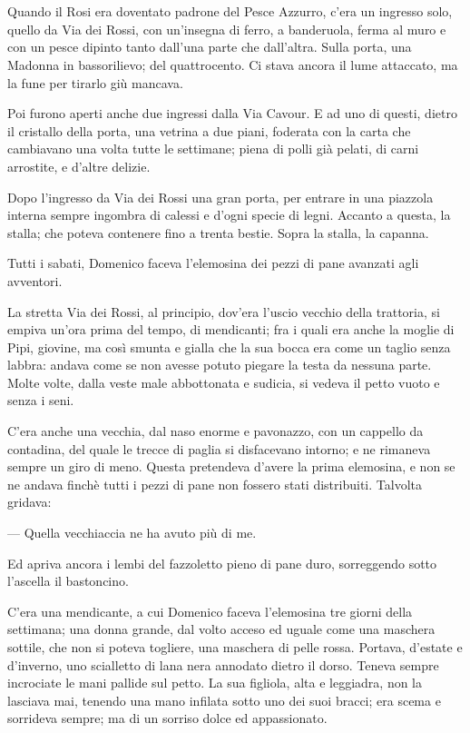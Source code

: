 \chapter{}

Quando il Rosi era doventato padrone del Pesce Azzurro, c’era un ingresso solo, quello da Via dei Rossi, con un’insegna di ferro, a banderuola, ferma al muro e con un pesce dipinto tanto dall’una parte che dall’altra. Sulla porta, una Madonna in bassorilievo; del quattrocento. Ci stava ancora il lume attaccato, ma la fune per tirarlo giù mancava.

Poi furono aperti anche due ingressi dalla Via Cavour. E ad uno di questi, dietro il cristallo della porta, una vetrina a due piani, foderata con la carta che cambiavano una volta tutte le settimane; piena di polli già pelati, di carni arrostite, e d’altre delizie.

Dopo l’ingresso da Via dei Rossi una gran porta, per entrare in una piazzola interna sempre ingombra di calessi e d’ogni specie di legni. Accanto a questa, la stalla; che poteva contenere fino a trenta bestie. Sopra la stalla, la capanna.

Tutti i sabati, Domenico faceva l’elemosina dei pezzi di pane avanzati agli avventori.

La stretta Via dei Rossi, al principio, dov’era l’uscio vecchio della trattoria, si empiva un’ora prima del tempo, di mendicanti; fra i quali era anche la moglie di Pipi, giovine, ma così smunta e gialla che la sua bocca era come un taglio senza labbra: andava come se non avesse potuto piegare la testa da nessuna parte. Molte volte, dalla veste male abbottonata e sudicia, si vedeva il petto vuoto e senza i seni.

C’era anche una vecchia, dal naso enorme e pavonazzo, con un cappello da contadina, del quale le trecce di paglia si disfacevano intorno; e ne rimaneva sempre un giro di meno. Questa pretendeva d’avere la prima elemosina, e non se ne andava finchè tutti i pezzi di pane non fossero stati distribuiti. Talvolta gridava:

— Quella vecchiaccia ne ha avuto più di me.

Ed apriva ancora i lembi del fazzoletto pieno di pane duro, sorreggendo sotto l’ascella il bastoncino.

C’era una mendicante, a cui Domenico faceva l’elemosina tre giorni della settimana; una donna grande, dal volto acceso ed uguale come una maschera sottile, che non si poteva togliere, una maschera di pelle rossa. Portava, d’estate e d’inverno, uno scialletto di lana nera annodato dietro il dorso. Teneva sempre incrociate le mani pallide sul petto. La sua figliola, alta e leggiadra, non la lasciava mai, tenendo una mano infilata sotto uno dei suoi bracci; era scema e sorrideva sempre; ma di un sorriso dolce ed appassionato.

